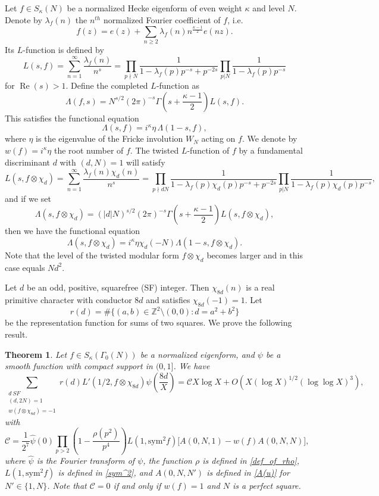 \documentclass[12pt]{amsart}
\def\Z{\mathbb{Z}}
\newtheorem{theorem}{Theorem}
\def\Z{\mathbb Z}
\def\Z{\mathbb Z}
\def\Re{\operatorname{Re}}
\def\log{\operatorname{log}}
\begin{document}
Let $f \in S_{\kappa}(N) $ be a normalized Hecke eigenform of even weight $\kappa$ and level $N$. Denote by $\lambda_f(n)$ the $n^{th}$ normalized Fourier coefficient of $f$, i.e. $$f(z)=e(z)+\sum_{n\geq 2}\lambda_f(n)n^{\frac{\kappa-1}{2}}e(nz).$$ Its $L$-function is defined by
\[L(s,f)=\sum_{n=1}^{\infty}\frac{\lambda_f(n)}{n^s}=\prod_{p\nmid N}\frac{1}{1-\lambda_f(p)p^{-s}+p^{-2s}}\prod_{p|N}\frac{1}{1-\lambda_f(p)p^{-s}}\]
for $\Re(s)>1$.
Define the completed $L$-function as
\[\Lambda(f,s)=N^{s/2}(2\pi)^{-s}\Gamma\left(s+\frac{\kappa-1}{2}\right)L(s,f).\]
This satisfies the functional equation
\[\Lambda(s,f)=i^{\kappa}\eta\,\Lambda(1-s,f),\]
where $\eta$ is the eigenvalue of the Fricke involution $W_N$ acting on $f$. We denote by $w(f)=i^{\kappa}\eta$ the root number of $f$.
The twisted $L$-function of $f$ by a fundamental discriminant $d$ with $(d,N)=1$ will satisfy
\[L(s,f\otimes\chi_d)=\sum_{n=1}^{\infty}\frac{\lambda_f(n)\chi_d(n)}{n^s}=\prod_{p\nmid dN}\frac{1}{1-\lambda_f(p)\chi_d(p)p^{-s}+p^{-2s}}\prod_{p|N}\frac{1}{1-\lambda_f(p)\chi_d(p)p^{-s}},\]
and if we set 
\[\Lambda(s,f\otimes\chi_d)=(|d|N)^{s/2}(2\pi)^{-s}\Gamma\left(s+\frac{\kappa-1}{2}\right)L(s,f\otimes \chi_d),\]
then we have the functional equation
\[\Lambda(s,f\otimes\chi_d)=i^{\kappa}\eta \chi_d(-N)\Lambda(1-s,f\otimes\chi_d).\]
Note that the level of the twisted modular form $f\otimes \chi_d$ becomes larger and in this case equals $Nd^2$.

Let $d$ be an odd, positive, squarefree (SF) integer. Then $\chi_{8d}(n)$ is a real primitive character with conductor $8d$ and satisfies $\chi_{8d}(-1)=1$. Let $$r(d)=\#\{(a,b)\in \Z^2\setminus (0,0): d=a^2+b^2\}$$ be the representation function for sums of two squares.  We prove the following result.

\begin{theorem}\label{MainTheorem}
Let $f\in S_{\kappa}(\Gamma_0(N))$ be a normalized eigenform, %
and $\psi$ be a smooth function with compact support in $(0,1]$. We have
    \[\sum_{\substack{d \ SF\\(d,2N)=1\\w(f\otimes\chi_{8d})=-1}}r(d)L'(1/2,f\otimes\chi_{8d})\psi\left(\frac{8d}{X}\right)=\mathcal{C}X\log X+O(X(\log X)^{1/2}(\log\log X)^3),\]
    with 
    \[\mathcal{C}=\frac{1}{2^7}\hat{\psi}(0)\prod_{p>2} \left( 1- \frac{\rho(p^2)}{p^4} \right)L(1,\text{sym}^2f)\Big[A(0,N,1)-w(f)A(0,N,N)\Big],
    \]
    where $\hat{\psi}$ is the Fourier transform of $\psi$, the function $\rho$ is defined in \eqref{def_of_rho}, $L(1,\text{sym}^2f)$ is defined in \eqref{sym^2}, and $A(0,N,N')$ is defined in \eqref{A(u)} for $N'\in\{1,N\}$. Note that $\mathcal{C}=0$ if and only if $w(f)=1$ and $N$ is a perfect square.
\end{theorem}
\end{document}
